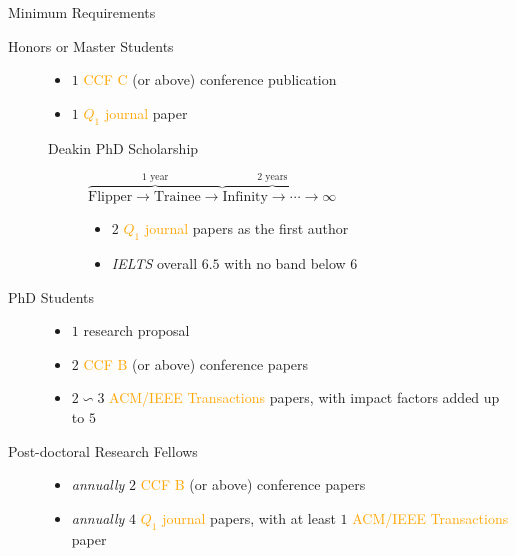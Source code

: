 \documentclass[
 size=14pt,
 paper=smartboard,  %
 mode=present, 		%
 display=slides, 	%
 style=tuliplab,  	%
 pauseslide,
 fleqn,leqno]{powerdot}{}
\begin{document}
\begin{slide}{Minimum Requirements}
\begin{description}
\item[Honors or Master Students]
    \begin{itemize}
        \item $1$ \textcolor{orange}{CCF C} (or above) conference publication
        \item $1$ \textcolor{orange}{$Q_1$ journal} paper
    \end{itemize}
    \begin{description}
  		\item[Deakin PhD Scholarship]
$\overbrace{\text{Flipper} \rightarrow \text{Trainee} \rightarrow}^{\text{1 year}}
\overbrace{\text{Infinity} \rightarrow \cdots \rightarrow }^{\text{2 years}} \infty$
    		\begin{itemize}
        		\item $2$ \textcolor{orange}{$Q_1$ journal} papers as the first author
        		\item \textit{IELTS} overall $6.5$ with no band below $6$
    		\end{itemize}
	\end{description}


\item[PhD Students]
    \begin{itemize}
        \item $1$ research proposal
        \item $2$ \textcolor{orange}{CCF B} (or above) conference papers
        \item $2 \backsim 3$ \textcolor{orange}{ACM/IEEE Transactions} papers,
        with impact factors added up to $5$
    \end{itemize}

\item[Post-doctoral Research Fellows]
    \begin{itemize}
    \item \textit{annually} $2$ \textcolor{orange}{CCF B} (or above) conference papers
    \item \textit{annually} $4$ \textcolor{orange}{$Q_1$ journal} papers,
     with at least $1$ \textcolor{orange}{ACM/IEEE Transactions} paper
    \end{itemize}

\end{description}
\end{slide}
\end{document}
